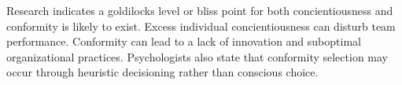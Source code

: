 \documentclass[review]{elsarticle}
\begin{document}
Research indicates a goldilocks level or bliss point for both concientiousness and conformity is likely to exist.
Excess individual concientiousness can disturb team performance\cite{curcseu2019personality}.
Conformity can lead to a lack of innovation and suboptimal organizational practices\cite{symon2006neglected}.
Psychologists also state that conformity selection may occur through heuristic decisioning rather than conscious choice.



\end{document}
